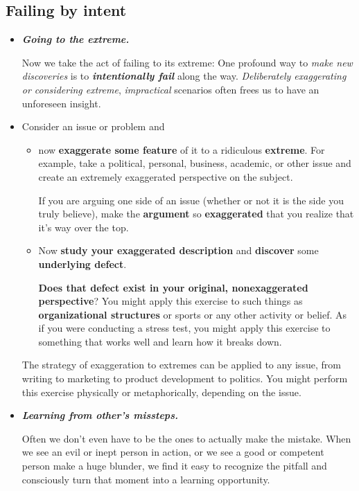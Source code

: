 \documentclass[11pt]{article}
\begin{document}
\subsection{Failing by intent}
\begin{itemize}
\item \emph{\textbf{Going to the extreme.}} 

Now we take the act of failing to its extreme: One profound way to \emph{make new discoveries} is to \emph{\textbf{intentionally fail}} along the way. \emph{Deliberately exaggerating or considering extreme}, \emph{impractical} scenarios often frees us to have an unforeseen insight.

\item \begin{exercise}
Consider an issue or problem and
\begin{itemize}
\item  now \textbf{exaggerate some feature} of it to a ridiculous \textbf{extreme}. For example, take a political, personal, business, academic, or other issue and create an extremely exaggerated perspective on the subject. 

If you are arguing one side of an issue (whether or not it is the side you truly believe), make the \textbf{argument} so \textbf{exaggerated} that you realize that it’s way over the top. 

\item Now \textbf{study your exaggerated description} and \textbf{discover} some \textbf{underlying defect}. 

\textbf{Does that defect exist in your original, nonexaggerated perspective}? You might apply this exercise to such things as \textbf{organizational structures} or sports or any other activity or belief. As if you were conducting a stress test, you might apply this exercise to something that works well and learn how it breaks down. 
\end{itemize}
\end{exercise}
The strategy of exaggeration to extremes can be applied to any issue, from writing to marketing to product development to politics. You might perform this exercise physically or metaphorically, depending on the issue.

\item \emph{\textbf{Learning from other’s missteps. }}

Often we don’t even have to be the ones to actually make the mistake. When we see an evil or inept person in action, or we see a good or competent person make a huge blunder, we find it easy to recognize the pitfall and consciously turn that moment into a learning opportunity.
\end{itemize}
\end{document}
